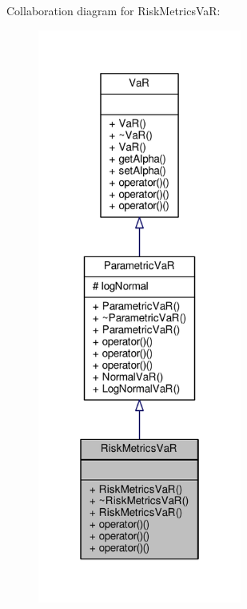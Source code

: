 Collaboration diagram for Risk\+Metrics\+VaR\+:
\nopagebreak
\begin{figure}[H]
\begin{center}
\leavevmode
\includegraphics[width=190pt]{classRiskMetricsVaR__coll__graph}
\end{center}
\end{figure}
